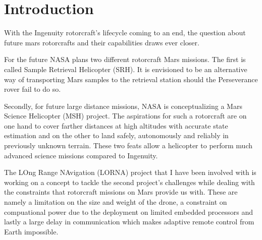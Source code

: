 \chapter{Introduction}
\label{sec:introduction}

With the Ingenuity rotorcraft's lifecycle coming to an end, the question about future mars rotorcrafts and their capabilities draws ever closer.

For the future NASA plans two different rotorcraft Mars missions. The first is called Sample Retrieval Helicopter (SRH). It is envisioned to be an alternative way of transporting Mars samples to the retrieval station should the Perseverance rover fail to do so.

Secondly, for future large distance missions, NASA is conceptualizing a Mars Science Helicopter (MSH) project. The aspirations for such a rotorcraft are on one hand to cover farther distances at high altitudes with accurate state estimation and on the other to land safely, autonomously and reliably in previously unknown terrain. These two feats allow a helicopter to perform much advanced science missions compared to Ingenuity. 

The LOng Range NAvigation (LORNA) project that I have been involved with is working on a concept to tackle the second project's challenges while dealing with the constraints that rotorcraft missions on Mars provide us with. These are namely a limitation on the size and weight of the drone, a constraint on compuational power due to the deployment on limited embedded processors and lastly a large delay in communication which makes adaptive remote control from Earth impossible.



